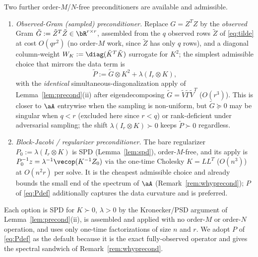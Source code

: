 \begin{remark}
\label{rem:altprecond}
Two further order-$M$/$N$-free preconditioners are available and admissible.
\begin{enumerate}[label=\textup{(\alph*)}]
\item \emph{Observed-Gram (sampled) preconditioner.} Replace $G=Z^{T}Z$ by the
      \emph{observed} Gram $\tilde G:=\tilde Z^{T}\tilde Z\in\bR^{r\times r}$,
      assembled from the $q$ observed rows $\tilde Z$ of \eqref{eq:tilde} at cost
      $O(qr^{2})$ (no order-$M$ work, since $\tilde Z$ has only $q$ rows), and
      a diagonal column-weight $W_K:=\diag(\tilde K^{T}\tilde K)$ surrogate for
      $K^{2}$; the simplest admissible choice that mirrors the data term is
      \[
        \tilde P:=\tilde G\otimes K^{2}+\lambda(I_r\otimes K),
      \]
      with the \emph{identical} simultaneous-diagonalization apply of
      Lemma~\ref{lem:precond}(ii) after eigendecomposing $\tilde G=\tilde V\tilde\Gamma\tilde V^{T}$
      ($O(r^{3})$). This is closer to $\aA$ entrywise when the sampling is
      non-uniform, but $\tilde G\succeq0$ may be singular when $q<r$ (excluded
      here since $r<q$) or rank-deficient under adversarial sampling; the shift
      $\lambda(I_r\otimes K)\succ0$ keeps $\tilde P\succ0$ regardless.
\item \emph{Block-Jacobi / regularizer preconditioner.} The bare regularizer
      $P_0:=\lambda(I_r\otimes K)$ is SPD (Lemma~\ref{lem:spd}), order-$M$-free,
      and its apply is $P_0^{-1}z=\lambda^{-1}\vecop(K^{-1}Z_0)$ via the
      one-time Cholesky $K=LL^{T}$ ($O(n^{3})$) at $O(n^{2}r)$ per solve. It is
      the cheapest admissible choice and already bounds the small end of the
      spectrum of $\aA$ (Remark~\ref{rem:whyprecond}); $P$ of \eqref{eq:Pdef}
      additionally captures the data curvature and is preferred.
\end{enumerate}
Each option is SPD for $K\succ0$, $\lambda>0$ by the Kronecker/PSD argument of
Lemma~\ref{lem:precond}(ii), is assembled and applied with no order-$M$ or
order-$N$ operation, and uses only one-time factorizations of size $n$ and $r$.
We adopt $P$ of \eqref{eq:Pdef} as the default because it is the exact
fully-observed operator and gives the spectral sandwich of
Remark~\ref{rem:whyprecond}.
\end{remark}

